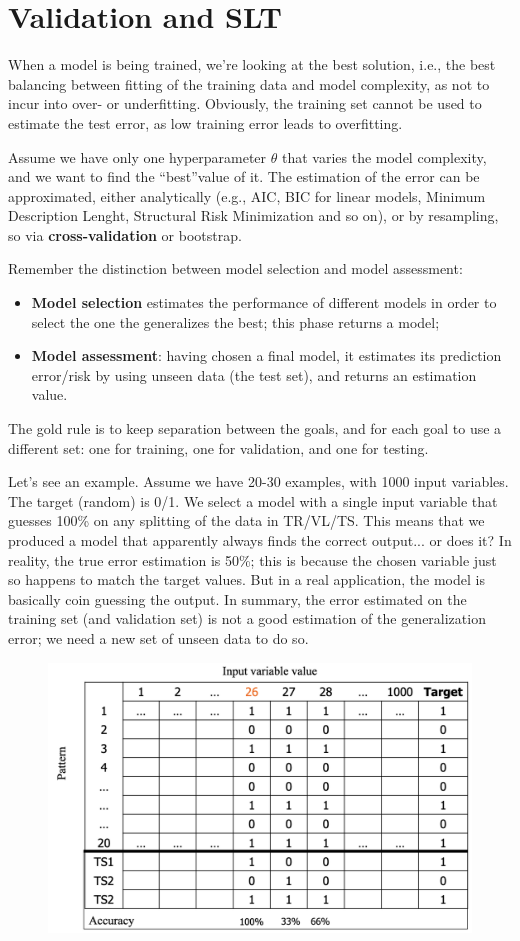 \chapter{Validation and SLT}

When a model is being trained, we're looking at the best solution, i.e., the best balancing between fitting of the training data and model complexity, as not to incur into over- or underfitting. Obviously, the training set cannot be used to estimate the test error, as low training error leads to overfitting.

Assume we have only one hyperparameter $\theta$ that varies the model complexity, and we want to find the ``best''value of it. The estimation of the error can be approximated, either analytically (e.g., AIC, BIC for linear models, Minimum Description Lenght, Structural Risk Minimization and so on), or by resampling, so via \textbf{cross-validation} or bootstrap.

Remember the distinction between model selection and model assessment:
\begin{itemize}
    \item \textbf{Model selection} estimates the performance of different models in order to select the one the generalizes the best; this phase returns a model;

    \item \textbf{Model assessment}: having chosen a final model, it estimates its prediction error/risk by using unseen data (the test set), and returns an estimation value.
\end{itemize}

The gold rule is to keep separation between the goals, and for each goal to use a different set: one for training, one for validation, and one for testing.

Let's see an example. Assume we have 20-30 examples, with 1000 input variables. The target (random) is 0/1. We select a model with a single input variable that guesses 100\% on any splitting of the data in TR/VL/TS. This means that we produced a model that apparently always finds the correct output... or does it? In reality, the true error estimation is 50\%; this is because the chosen variable just so happens to match the target values. But in a real application, the model is basically coin guessing the output. In summary, the error estimated on the training set (and validation set) is not a good estimation of the generalization error; we need a new set of unseen data to do so.

\begin{figure}[h]
    \centering\includegraphics[width=0.5\linewidth]{img/table_counterex.png}
\end{figure}

